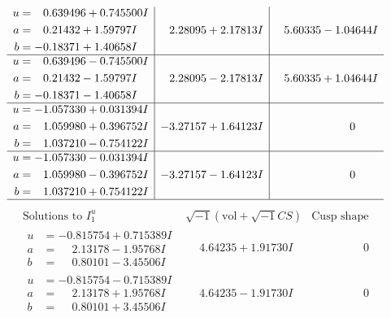 \documentclass[1p]{elsarticle_modified}
\theoremstyle{definition}
\newcommand{\I}{\sqrt{-1}}
\begin{document}
$$\begin{array}{c|c|c}
\begin{aligned}
u &= \phantom{-}0.639496 + 0.745500 I \\
a &= \phantom{-}0.21432 + 1.59797 I \\
b &= -0.18371 + 1.40658 I\end{aligned}
 & \phantom{-}2.28095 + 2.17813 I & \phantom{-}5.60335 - 1.04644 I \\ \hline\begin{aligned}
u &= \phantom{-}0.639496 - 0.745500 I \\
a &= \phantom{-}0.21432 - 1.59797 I \\
b &= -0.18371 - 1.40658 I\end{aligned}
 & \phantom{-}2.28095 - 2.17813 I & \phantom{-}5.60335 + 1.04644 I \\ \hline\begin{aligned}
u &= -1.057330 + 0.031394 I \\
a &= \phantom{-}1.059980 + 0.396752 I \\
b &= \phantom{-}1.037210 - 0.754122 I\end{aligned}
 & -3.27157 + 1.64123 I & \phantom{-0.000000 } 0 \\ \hline\begin{aligned}
u &= -1.057330 - 0.031394 I \\
a &= \phantom{-}1.059980 - 0.396752 I \\
b &= \phantom{-}1.037210 + 0.754122 I\end{aligned}
 & -3.27157 - 1.64123 I & \phantom{-0.000000 } 0\\
 \hline 
 \end{array}$$\newpage$$\begin{array}{c|c|c}  
\text{Solutions to }I^u_{1}& \I (\text{vol} + \sqrt{-1}CS) & \text{Cusp shape}\\
 \hline 
\begin{aligned}
u &= -0.815754 + 0.715389 I \\
a &= \phantom{-}2.13178 - 1.95768 I \\
b &= \phantom{-}0.80101 - 3.45506 I\end{aligned}
 & \phantom{-}4.64235 + 1.91730 I & \phantom{-0.000000 } 0 \\ \hline\begin{aligned}
u &= -0.815754 - 0.715389 I \\
a &= \phantom{-}2.13178 + 1.95768 I \\
b &= \phantom{-}0.80101 + 3.45506 I\end{aligned}
 & \phantom{-}4.64235 - 1.91730 I & \phantom{-0.000000 } 0 \\ \hline\begin{aligned}

\end{aligned}
\end{array}$$
\end{document}
